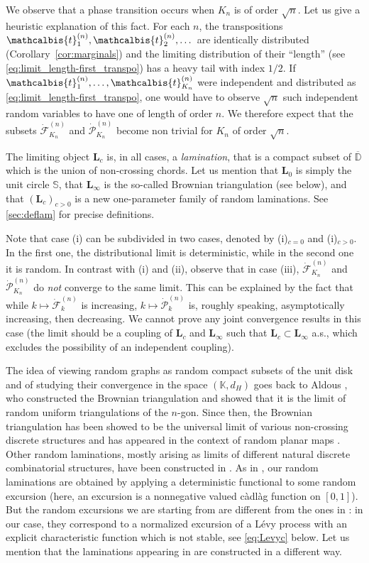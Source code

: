 \documentclass[AHL,XML,longabstracts,Unicode]{cedram}
\newcommand{\D}{\mathbb{D}}
\def\PPP{\mathcal P}
\def\FFF{\mathcal F}
\def\dFKn{\dot{\mathcal{F}}^{(n)}_{K_{n}}}
\def\dPKn{\dot{\mathcal{P}}^{(n)}_{K_{n}}}
\def\tb{\mathcalbis{t}}
\begin{document}
We observe that a phase transition occurs when $K_n$ is of order $\sqrt{n}$.
Let us give a heuristic explanation of this fact.
For each $n$, the transpositions $\tb_{1}^{(n)}, \tb_{2}^{(n)}, \dots$ are identically distributed (Corollary~\ref{cor:marginals})
and the limiting distribution of their ``length'' (see \eqref{eq:limit_length-first_transpo}) has a heavy tail with index $1/2$.
If $\tb_{1}^{(n)}, \ldots, \tb_{ K_{n}}^{(n)}$ were independent and distributed as \eqref{eq:limit_length-first_transpo},
one would have to observe $\sqrt{n}$ such independent random variables to have one of length of order $n$.
We therefore expect that the subsets $\dFKn$ and $\dPKn$ become non trivial for $K_n$ of order $\sqrt{n}$.
\medskip

The limiting object $\mathbf{L}_{c}$  is, in all cases, a \emph{lamination},
that is a compact subset of $\overline{\D}$ which is  the union of non-crossing chords. Let us mention that $\mathbf{L}_{0}$ is simply the unit circle $\mathbb{S}$, that $\mathbf{L}_{\infty}$ is the so-called Brownian triangulation (see below), and that $(\mathbf{L}_{c})_{c  > 0}$ is a new one-parameter family of random laminations. See \cref{sec:deflam} for  precise definitions.

Note that case (i) can be subdivided in two cases, denoted by (i)$_{c=0}$ and  (i)$_{c>0}$. In the first one, the distributional limit is deterministic, while in the second one it is random.
In contrast with (i) and (ii),  observe that in case (iii),
$\dFKn$ and $\dPKn$ do \emph{not} converge to the same limit.
This can be  explained by the fact that while $k \mapsto \dot{\FFF}^{(n)}_{k}$ is increasing,
$k \mapsto \dot{\PPP}^{(n)}_{k}$ is, roughly speaking, asymptotically increasing, then decreasing.
We cannot prove any joint convergence results in this case
(the limit should be a coupling of $\mathbf{L}_{c}$ and $\mathbf{L}_{\infty}$
such that $\mathbf{L}_{c} \subset \mathbf{L}_{\infty}$ a.s.,
which excludes the possibility of an independent coupling).

The idea of viewing random graphs as random compact subsets of the unit disk and of studying their convergence in the space $(\mathbb{K},d_{H})$ goes back to Aldous \cite{Ald94a,Ald94b}, who constructed the Brownian triangulation and showed that it is the limit of random uniform triangulations of the $n$-gon.
Since then, the Brownian triangulation has been showed to be the universal limit of various non-crossing discrete structures \cite{Kor14,CK14,KM17,Bet17} and has appeared in the context of random planar maps \cite{LGP08}.
Other random laminations, mostly arising as limits of different natural discrete combinatorial structures, have been constructed in \cite{CLGrecursive,CWmht,Kor14,KM16}.
As in \cite{Kor14}, our random laminations are obtained by applying a deterministic functional  to some random excursion
(here, an excursion is a nonnegative valued c\`adl\`ag function on $[0,1]$).
But the random excursions we are starting from are different from the ones in \cite{Kor14}:
in our case, they correspond to a normalized excursion of a L\'evy process with
an explicit characteristic function which is not stable, see \cref{eq:Levyc} below.
Let us mention that the laminations appearing in \cite{CLGrecursive,CWmht,KM16} are constructed in a different way.
\end{document}
